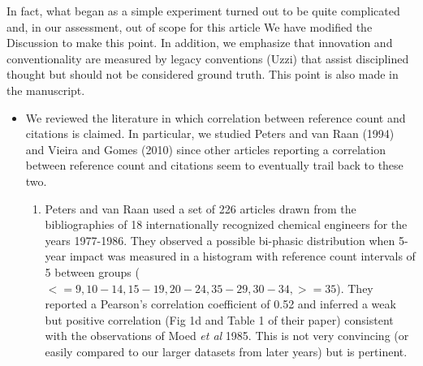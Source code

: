 \documentclass[11pt, oneside]{article}   	%
\begin{document}
In fact, what began as a simple experiment turned out to be quite complicated and, in our assessment, out of scope for this article  We have modified the Discussion to make this point. In addition, we emphasize that innovation and conventionality are measured by legacy conventions (Uzzi) that assist disciplined thought but should not be considered ground truth. This point is also made in the manuscript.

\begin{itemize}
 \item We reviewed the literature in which correlation between reference count and citations is claimed. In particular, we studied Peters and van Raan (1994) and Vieira and Gomes (2010) since other articles reporting a correlation between reference count and citations seem to eventually trail back to these two. 
\begin{enumerate}
\item Peters and van Raan used a set of 226 articles drawn from the bibliographies of 18 internationally recognized chemical engineers for the years 1977-1986. They observed a possible bi-phasic distribution when 5-year impact was measured in a histogram with reference count intervals of 5 between groups ($<=9, 10-14, 15-19, 20-24, 35-29, 30-34, >=35$). They reported a Pearson's correlation coefficient of 0.52 and inferred a weak but positive correlation (Fig 1d and Table 1 of their paper) consistent with the observations of Moed \emph{et al} 1985. This is not very convincing (or easily compared to our larger datasets from later years) but is pertinent. 


\end{enumerate}
\end{itemize}
\end{document}
